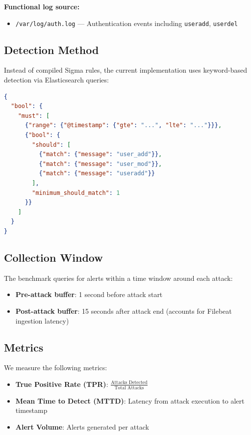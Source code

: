 \documentclass[11pt,a4paper]{article}
\begin{document}
\textbf{Functional log source:}
\begin{itemize}
    \item \texttt{/var/log/auth.log} --- Authentication events including \texttt{useradd}, \texttt{userdel}
\end{itemize}

\subsection{Detection Method}

Instead of compiled Sigma rules, the current implementation uses keyword-based detection via Elasticsearch queries:

\begin{lstlisting}[language=json,caption={Detection Query for T1136.001}]
{
  "bool": {
    "must": [
      {"range": {"@timestamp": {"gte": "...", "lte": "..."}}},
      {"bool": {
        "should": [
          {"match": {"message": "user_add"}},
          {"match": {"message": "user_mod"}},
          {"match": {"message": "useradd"}}
        ],
        "minimum_should_match": 1
      }}
    ]
  }
}
\end{lstlisting}

\subsection{Collection Window}

The benchmark queries for alerts within a time window around each attack:
\begin{itemize}
    \item \textbf{Pre-attack buffer}: 1 second before attack start
    \item \textbf{Post-attack buffer}: 15 seconds after attack end (accounts for Filebeat ingestion latency)
\end{itemize}

\subsection{Metrics}

We measure the following metrics:

\begin{itemize}
    \item \textbf{True Positive Rate (TPR)}: $\frac{\text{Attacks Detected}}{\text{Total Attacks}}$
    \item \textbf{Mean Time to Detect (MTTD)}: Latency from attack execution to alert timestamp
    \item \textbf{Alert Volume}: Alerts generated per attack
\end{itemize}
\end{document}
